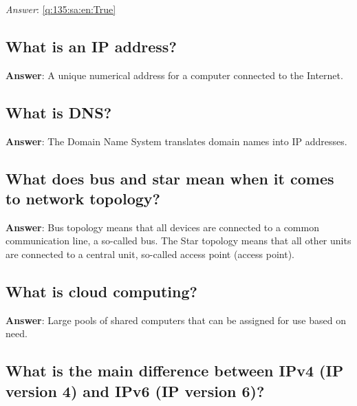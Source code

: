 \documentclass[a4paper,11pt,oneside]{article}
\begin{document}
\begin{sloppypar}
\label{q:135:sa:en:True}

\vspace{2cm}

\noindent\makebox[\textwidth]{\hrulefill}

\vspace{1cm}

\textit{Answer}: \autoref{q:135:sa:en:True}



\subsection{What is an IP address?}

\label{q:136:sa:en:True}

\textbf{Answer}: A unique numerical address for a computer connected to the Internet.



\subsection{What is DNS?}

\label{q:137:sa:en:True}

\textbf{Answer}: The Domain Name System translates domain names into IP addresses.



\subsection{What does bus and star mean when it comes to network topology?}

\label{q:138:sa:en:True}

\textbf{Answer}: Bus topology means that all devices are connected to a common communication line, a so-called bus. The Star topology means that all other units are connected to a central unit, so-called access point (access point).



\subsection{What is cloud computing?}

\label{q:139:sa:en:True}

\textbf{Answer}: Large pools of shared computers that can be assigned for use based on need.



\subsection{What is the main difference between IPv4 (IP version 4) and IPv6 (IP version 6)?}


\end{sloppypar}
\end{document}

